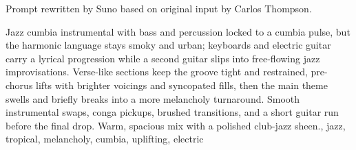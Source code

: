 

\begin{notes}
Prompt rewritten by Suno based on original input by Carlos Thompson.
\end{notes}

\begin{prompt}
Jazz cumbia instrumental with bass and percussion locked to a cumbia pulse, but the harmonic language stays smoky and urban; keyboards and electric guitar carry a lyrical progression while a second guitar slips into free-flowing jazz improvisations. %
Verse-like sections keep the groove tight and restrained, pre-chorus lifts with brighter voicings and syncopated fills, then the main theme swells and briefly breaks into a more melancholy turnaround. %
Smooth instrumental swaps, conga pickups, brushed transitions, and a short guitar run before the final drop. %
Warm, spacious mix with a polished club-jazz sheen., jazz, tropical, melancholy, cumbia, uplifting, electric
\end{prompt}

\sepbar

